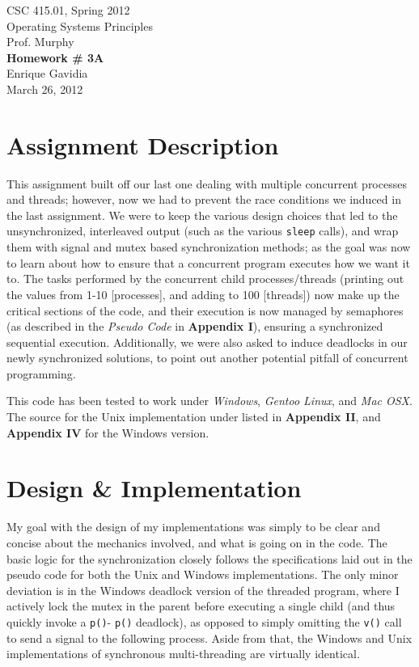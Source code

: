 \documentclass[12pt]{article}
\def \name       {Enrique Gavidia}
\def \coursenum  {CSC 415.01}
\def \coursename {Operating Systems Principles}
\def \instructor {Prof. Murphy}
\def \semester   {Spring 2012}
\def \assignment {Homework \# 3A}
\def \duedate    {March 26, 2012}
\newcommand {\makecover} {
  \begin{titlepage}
    \begin{center}
      \LARGE{\coursenum, \semester \\ \coursename}\\
      \Large{\instructor}\\
      \vfill
      \textbf{\Huge \assignment}\\
      \vfill
      \Large{\name}\\
      \large{\duedate}
    \end{center}
  \end{titlepage}
}
\begin{document}
\makecover

\section*{Assignment Description}
This assignment built off our last one dealing with multiple concurrent processes and threads; however, now we had to prevent the race
conditions we induced in the last assignment. We were to keep the various design choices that led to the unsynchronized, interleaved output 
(such as the various \texttt{sleep} calls), and wrap them with signal and mutex based synchronization methods; as the goal was now to learn
about how to ensure that a concurrent program executes how we want it to.  The tasks performed by the concurrent child processes/threads 
(printing out the values from 1-10 [processes], and adding to 100 [threads]) now make up the critical sections of the code, and their execution
is now managed by semaphores (as described in the \textsl{Pseudo Code} in \textbf{Appendix I}), ensuring a synchronized sequential execution.
Additionally, we were also asked to induce deadlocks in our newly synchronized solutions, to point out another potential pitfall of concurrent
programming.

This code has been tested to work under \textsl{Windows}, \textsl{Gentoo Linux}, and \textsl{Mac OSX}.
The source for the Unix implementation under listed in \textbf{Appendix II}, and \textbf{Appendix IV} for the Windows version.

\section*{Design \& Implementation}
My goal with the design of my implementations was simply to be clear and concise about the mechanics involved, and what is going on in the code.
The basic logic for the synchronization closely follows the specifications laid out in the pseudo code for both the Unix and Windows implementations.
The only minor deviation is in the Windows deadlock version of the threaded program, where I actively lock the mutex in the parent before executing a
single child (and thus quickly invoke a \texttt{p()}- \texttt{p()} deadlock), as opposed to simply omitting the \texttt{v()} call to send a signal to the following process.
Aside from that, the Windows and Unix implementations of synchronous multi-threading are virtually identical.
\end{document}
